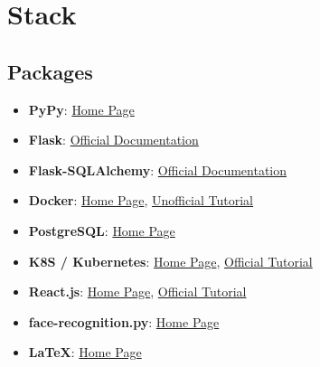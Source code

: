 
\chapter{Stack} %

\section*{Packages}
\begin{itemize}
    \item \textbf{PyPy}: \href{https://www.pypy.org/}{Home Page}
    \item \textbf{Flask}: \href{https://flask.palletsprojects.com/en/2.0.x/}{Official Documentation}
    \item \textbf{Flask-SQLAlchemy}: \href{https://flask-sqlalchemy.palletsprojects.com/en/2.x/}{Official Documentation}
    \item \textbf{Docker}: \href{https://www.docker.com/}{Home Page}, \href{https://docker-curriculum.com/}{Unofficial Tutorial}
    \item \textbf{PostgreSQL}: \href{https://www.postgresql.org/}{Home Page}
    \item \textbf{K8S / Kubernetes}: \href{https://kubernetes.io/}{Home Page}, \href{https://kubernetes.io/docs/tutorials/kubernetes-basics/}{Official Tutorial}
    \item \textbf{React.js}: \href{https://reactjs.org/}{Home Page}, \href{https://reactjs.org/tutorial/tutorial.html}{Official Tutorial}
    \item \textbf{face-recognition.py}: \href{https://pypi.org/project/face-recognition/}{Home Page}
    \item \textbf{\LaTeX}: \href{https://www.latex-project.org/}{Home Page}
\end{itemize}

